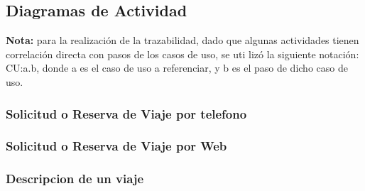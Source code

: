 \subsection{Diagramas de Actividad}

\textbf{Nota:} para la realizaci\'on de la trazabilidad, dado que algunas actividades tienen correlaci\'on directa con pasos de los casos de uso, se uti
liz\'o la siguiente notaci\'on: CU:a.b, donde a es el caso de uso a referenciar, y b es el paso de dicho caso de uso.

\subsubsection{Solicitud o Reserva de Viaje por telefono}
\subsubsection{Solicitud o Reserva de Viaje por Web}
\label{da:descripcionviaje}
\subsubsection{Descripcion de un viaje}

